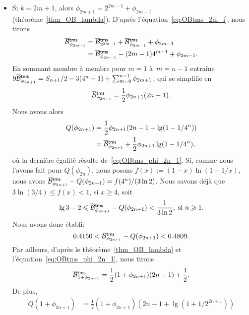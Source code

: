 \begin{itemize}
  \item Si \(k=2m+1\), alors \(\phi_{2m+1} = 2^{2m-1} + \phi_{2m-1}\)
    (théorème~\ref{thm_OB_lambda}). D'après
    l'équation~\eqref{eq:OBtms_2m_i}, nous tirons
    \begin{align*}
      \OB{\fun{tms}}{\phi_{2m+1}} &= \OB{\fun{tms}}{2^{2m-1}} +
      \OB{\fun{tms}}{\phi_{2m-1}} + \phi_{2m-1}\\
      &= \OB{\fun{tms}}{\phi_{2m-1}} - (2m-1)4^{m-1} + \phi_{2m-1}.
    \end{align*}
    En sommant membre à membre pour \(m=1\) à~\(m=n-1\) entraîne
    \(9\OB{\fun{tms}}{\phi_{2n+1}} = S_{n+1}/2 - 3(4^n-1) +
    \sum_{m=0}^{n-1}\phi_{2m+1}\), qui se simplifie en
    \begin{equation}
      \OB{\fun{tms}}{\phi_{2n+1}} = \frac{1}{2}\phi_{2n+1}(2n - 1).
      \label{eq:OBtms_phi_2n_1}
    \end{equation}
    Nous avons alors
    \begin{align*}
      Q(\phi_{2n+1}) &= \frac{1}{2}\phi_{2n+1}(2n-1 + \lg(1-1/4^n))\\
      &= \OB{\fun{tms}}{\phi_{2n+1}} + \frac{1}{2}\phi_{2n+1}\lg(1-1/4^n),
    \end{align*}
    où la dernière égalité résulte de~\eqref{eq:OBtms_phi_2n_1}. Si,
    comme nous l'avons fait pour \(Q(\phi_{2n})\), nous posons \(f(x)
    := (1-x)\ln(1-1/x)\), nous avons \(\OB{\fun{tms}}{\phi_{2n+1}} -
    Q(\phi_{2n+1}) = f(4^n)/(3\ln 2)\). Nous savons déjà que
    \(3\ln(3/4) \leqslant f(x) < 1\), si \(x \geqslant 4\),
    soit
    \begin{equation*}
      \lg 3 - 2 \leqslant \OB{\fun{tms}}{\phi_{2n+1}} -
      Q(\phi_{2n+1}) < \frac{1}{3\ln 2},\; \text{si \(n \geqslant 1\)}.
    \end{equation*}
    Nous avons donc établi:
    \begin{equation}
      0.4150 < \smash{\OB{\fun{tms}}{\phi_{2n+1}}} -
      Q(\phi_{2n+1}) < 0.4809.
      \label{ineq:OBtms_phi_2n_1}
    \end{equation}
    Par ailleurs, d'après le théorème~\ref{thm_OB_lambda} et
    l'équation~\eqref{eq:OBtms_phi_2n_1}, nous tirons
    \begin{equation}
      \OB{\fun{tms}}{1+\phi_{2n+1}} = \frac{1}{2}(1+\phi_{2n+1})(2n - 1)
      + \frac{1}{2}.
      \label{eq:OBtms_succ_phi_2n_1}
    \end{equation}
    De plus,
    \begin{align*}
      Q(1+\phi_{2n+1}) &= \frac{1}{2}(1+\phi_{2n+1})(2n-1 + \lg(1+1/2^{2n+1}))\\

\end{align*}
\end{itemize}
